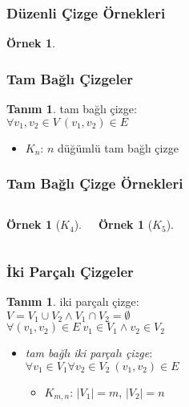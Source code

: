 \documentclass[dvipsnames]{beamer}
\theoremstyle{definition}
\newtheorem{tanim}[theorem]{Tanım}
\theoremstyle{example}
\newtheorem{ornek}[theorem]{Örnek}
\theoremstyle{plain}
\begin{document}
\begin{frame}
  \frametitle{Düzenli Çizge Örnekleri}

  \begin{ornek}
    \begin{center}
    \end{center}
  \end{ornek}
\end{frame}

\begin{frame}
  \frametitle{Tam Bağlı Çizgeler}

  \begin{tanim}
    \alert{tam bağlı çizge}:\\
    $\forall v_1,v_2 \in V~(v_1,v_2) \in E$

    \begin{itemize}
      \item $K_n$: $n$ düğümlü tam bağlı çizge
    \end{itemize}
  \end{tanim}
\end{frame}

\begin{frame}
  \frametitle{Tam Bağlı Çizge Örnekleri}

  \begin{columns}
    \begin{ornek}[$K_4$]
      \begin{center}
      \end{center}
    \end{ornek}

    \begin{ornek}[$K_5$]
      \begin{center}
      \end{center}
    \end{ornek}
  \end{columns}
\end{frame}

\begin{frame}
  \frametitle{İki Parçalı Çizgeler}

  \begin{tanim}
    \alert{iki parçalı çizge}:\\
    $V = V_1 \cup V_2 \wedge V_1 \cap V_2 = \emptyset$\\
    $\forall (v_1,v_2) \in E~v_1 \in V_1 \wedge v_2 \in V_2$

    \pause
    \begin{itemize}
      \item \emph{tam bağlı iki parçalı çizge}:\\
      $\forall v_1 \in V_1 \forall v_2 \in V_2~(v_1,v_2) \in E$
      \begin{itemize}
        \item $K_{m,n}$: $|V_1|=m$, $|V_2|=n$
      \end{itemize}
    \end{itemize}
  \end{tanim}
\end{frame}
\end{document}
